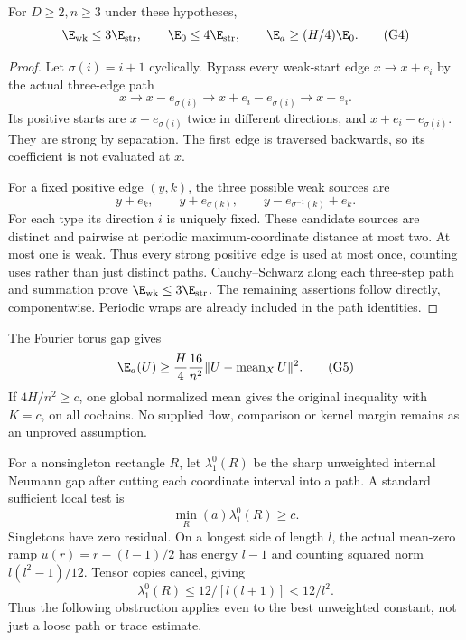 \begin{lemma}\label{lem:geo-detour}
For $D\geq2,n\geq3$ under these hypotheses,
\[
 \E_{\rm wk}\leq3\E_{\rm str},\qquad
 \E_0\leq4\E_{\rm str},\qquad \E_a\geq(H/4)\E_0.         \tag{G4}
\]
\end{lemma}
\begin{proof}
Let $\sigma(i)=i+1$ cyclically. Bypass every weak-start edge $x\to x+e_i$
by the actual three-edge path
\[
 x\longrightarrow x-e_{\sigma(i)}
 \longrightarrow x+e_i-e_{\sigma(i)}\longrightarrow x+e_i.
\]
Its positive starts are $x-e_{\sigma(i)}$ twice in different directions,
and $x+e_i-e_{\sigma(i)}$. They are strong by separation. The first edge
is traversed backwards, so its coefficient is not evaluated at $x$.

For a fixed positive edge $(y,k)$, the three possible weak sources are
\[
 y+e_k,\qquad y+e_{\sigma(k)},\qquad
 y-e_{\sigma^{-1}(k)}+e_k.
\]
For each type its direction $i$ is uniquely fixed. These candidate sources
are distinct and pairwise at periodic maximum-coordinate distance at most
two. At most one is weak. Thus every strong positive edge is used at most
once, counting uses rather than just distinct paths. Cauchy--Schwarz along
each three-step path and summation prove $\E_{\rm wk}\leq3\E_{\rm str}$.
The remaining assertions follow directly, componentwise. Periodic wraps
are already included in the path identities.
\end{proof}
The Fourier torus gap gives
\[
 \E_a(U)\geq\frac H4\frac{16}{n^2}\|U-\operatorname{mean}_XU\|^2.
                                                                    \tag{G5}
\]
If $4H/n^2\geq c$, one global normalized mean gives the original inequality
with $K=c$, on all cochains. No supplied flow, comparison or kernel margin
remains as an unproved assumption.

For a nonsingleton rectangle $R$, let $\lambda_1^0(R)$ be the sharp
unweighted internal Neumann gap after cutting each coordinate interval
into a path. A standard sufficient local test is
\[
       \min_R(a)\lambda_1^0(R)\geq c.                      \tag{G6}
\]
Singletons have zero residual. On a longest side of length $l$, the actual
mean-zero ramp $u(r)=r-(l-1)/2$ has energy $l-1$ and counting squared norm
$l(l^2-1)/12$. Tensor copies cancel, giving
\[
       \lambda_1^0(R)\leq12/[l(l+1)]<12/l^2.              \tag{G7}
\]
Thus the following obstruction applies even to the best unweighted
constant, not just a loose path or trace estimate.


